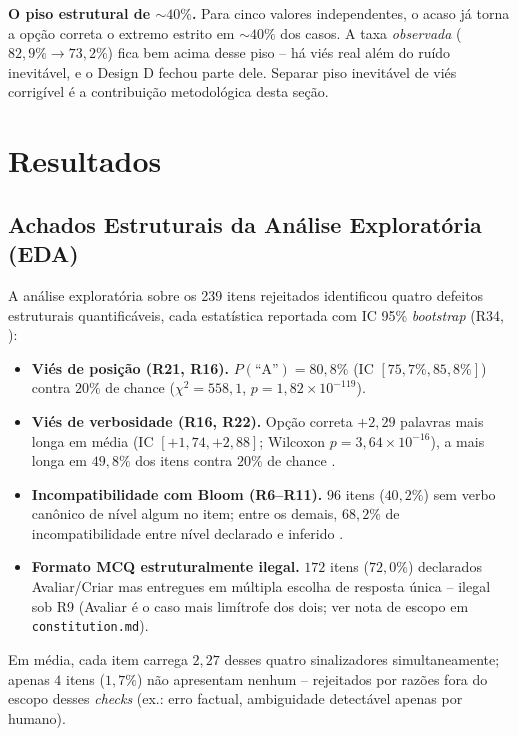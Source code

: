 \documentclass[12pt]{article}
\begin{document}
\textbf{O piso estrutural de $\sim$$40\%$.} Para cinco valores
independentes, o acaso já torna a opção correta o extremo estrito em
$\sim$$40\%$ dos casos. A taxa \emph{observada}
($82{,}9\%\to73{,}2\%$) fica bem acima desse piso -- há viés real além
do ruído inevitável, e o Design D fechou parte dele. Separar piso
inevitável de viés corrigível é a contribuição metodológica desta
seção.

\section{Resultados}
\label{sec:resultados}

\subsection{Achados Estruturais da Análise Exploratória (EDA)}
\label{sec:eda}

A análise exploratória sobre os 239 itens rejeitados
identificou quatro defeitos estruturais
quantificáveis, cada estatística reportada com IC 95\% \emph{bootstrap}
(R34, \cite{saleva2025beyond}):

\begin{itemize}
\item \textbf{Viés de posição (R21, R16).} $P(\text{``A''})=80{,}8\%$
  (IC $[75{,}7\%,85{,}8\%]$) contra $20\%$ de chance
  ($\chi^2=558{,}1$, $p=1{,}82\times10^{-119}$).
\item \textbf{Viés de verbosidade (R16, R22).} Opção correta $+2{,}29$
  palavras mais longa em média (IC $[+1{,}74,+2{,}88]$; Wilcoxon
  $p=3{,}64\times10^{-16}$), a mais longa em $49{,}8\%$ dos itens contra
  $20\%$ de chance \cite{haladyna2002review}.
\item \textbf{Incompatibilidade com Bloom (R6--R11).} $96$ itens
  ($40{,}2\%$) sem verbo canônico de nível algum no item; entre os
  demais, $68{,}2\%$ de incompatibilidade entre nível declarado e
  inferido \cite{haladyna2013developing}.
\item \textbf{Formato MCQ estruturalmente ilegal.} $172$ itens
  ($72{,}0\%$) declarados Avaliar/Criar mas entregues em múltipla
  escolha de resposta única -- ilegal sob R9 (Avaliar é o caso mais
  limítrofe dos dois; ver nota de escopo em \texttt{constitution.md}).
\end{itemize}

Em média, cada item carrega $2{,}27$ desses quatro sinalizadores
simultaneamente; apenas $4$ itens ($1{,}7\%$) não apresentam nenhum --
rejeitados por razões fora do escopo desses \emph{checks} (ex.: erro
factual, ambiguidade detectável apenas por humano).
\end{document}

